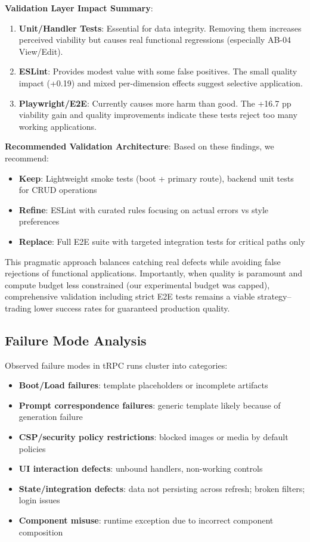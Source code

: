 \documentclass{article}
\begin{document}
\textbf{Validation Layer Impact Summary}:
\begin{enumerate}
\item \textbf{Unit/Handler Tests}: Essential for data integrity. Removing them increases perceived viability but causes real functional regressions (especially AB-04 View/Edit).
\item \textbf{ESLint}: Provides modest value with some false positives. The small quality impact (+0.19) and mixed per-dimension effects suggest selective application.
\item \textbf{Playwright/E2E}: Currently causes more harm than good. The +16.7 pp viability gain and quality improvements indicate these tests reject too many working applications.
\end{enumerate}

\textbf{Recommended Validation Architecture}:
Based on these findings, we recommend:
\begin{itemize}
\item \textbf{Keep}: Lightweight smoke tests (boot + primary route), backend unit tests for CRUD operations
\item \textbf{Refine}: ESLint with curated rules focusing on actual errors vs style preferences
\item \textbf{Replace}: Full E2E suite with targeted integration tests for critical paths only
\end{itemize}

This pragmatic approach balances catching real defects while avoiding false rejections of functional applications. Importantly, when quality is paramount and compute budget less constrained (our experimental budget was capped), comprehensive validation including strict E2E tests remains a viable strategy--trading lower success rates for guaranteed production quality.

\subsection{Failure Mode Analysis}

Observed failure modes in tRPC runs cluster into categories:

\begin{itemize}
\item \textbf{Boot/Load failures}: template placeholders or incomplete artifacts
\item \textbf{Prompt correspondence failures}: generic template likely because of generation failure
\item \textbf{CSP/security policy restrictions}: blocked images or media by default policies
\item \textbf{UI interaction defects}: unbound handlers, non-working controls
\item \textbf{State/integration defects}: data not persisting across refresh; broken filters; login issues
\item \textbf{Component misuse}: runtime exception due to incorrect component composition
\end{itemize}
\end{document}
